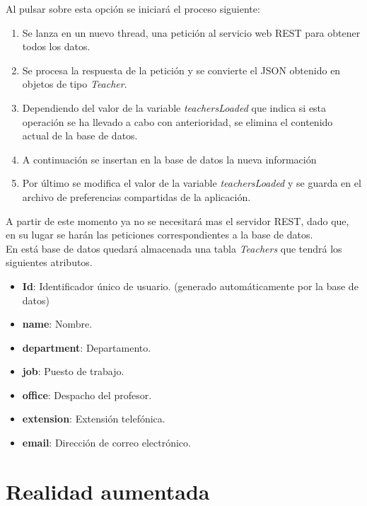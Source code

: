 \documentclass[12pt, a4paper, titlepage]{article}
\begin{document}
	Al pulsar sobre esta opción se iniciará el proceso siguiente:
	\begin{enumerate}
		\item Se lanza en un nuevo thread, una petición al servicio web REST para obtener todos los datos.
		\item Se procesa la respuesta de la petición y se convierte el JSON obtenido en objetos de tipo \textit{Teacher}.
		\item Dependiendo del valor de la variable \textit{teachersLoaded} que indica si esta operación se ha llevado a cabo con anterioridad, se elimina el contenido actual de la base de datos.
		\item A continuación se insertan en la base de datos la nueva información
		\item Por último se modifica el valor de la variable \textit{teachersLoaded} y se guarda en el archivo de preferencias compartidas de la aplicación.
	\end{enumerate}	
	
	A partir de este momento ya no se necesitará mas el servidor REST, dado que, en su lugar se harán las peticiones correspondientes a la base de datos.\\
	En está base de datos quedará almacenada una tabla \textit{Teachers} que tendrá los siguientes atributos.
	\begin{itemize}
		\item \textbf{Id}: Identificador único de usuario. (generado automáticamente por la base de datos)
		\item \textbf{name}: Nombre. 
		\item \textbf{department}: Departamento.
		\item  \textbf{job}: Puesto de trabajo.
		\item \textbf{office}: Despacho del profesor.
		\item \textbf{extension}: Extensión telefónica.
		\item \textbf{email}: Dirección de correo electrónico.
	\end{itemize}
	
	\clearpage

	\section{Realidad aumentada}
\end{document}
